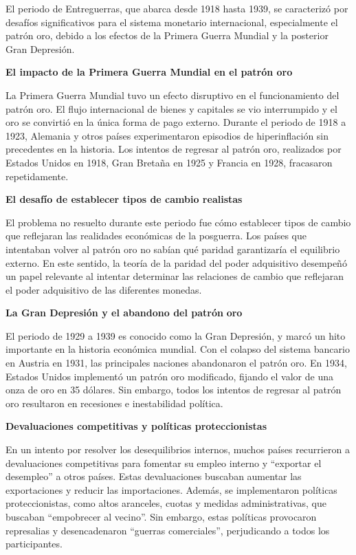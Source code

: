 \documentclass[
  a4paper,
]{article}
\begin{document}
El periodo de Entreguerras, que abarca desde 1918 hasta 1939, se
caracterizó por desafíos significativos para el sistema monetario
internacional, especialmente el patrón oro, debido a los efectos de la
Primera Guerra Mundial y la posterior Gran Depresión.

\textbf{El impacto de la Primera Guerra Mundial en el patrón oro}

La Primera Guerra Mundial tuvo un efecto disruptivo en el funcionamiento
del patrón oro. El flujo internacional de bienes y capitales se vio
interrumpido y el oro se convirtió en la única forma de pago externo.
Durante el periodo de 1918 a 1923, Alemania y otros países
experimentaron episodios de hiperinflación sin precedentes en la
historia. Los intentos de regresar al patrón oro, realizados por Estados
Unidos en 1918, Gran Bretaña en 1925 y Francia en 1928, fracasaron
repetidamente.

\textbf{El desafío de establecer tipos de cambio realistas}

El problema no resuelto durante este periodo fue cómo establecer tipos
de cambio que reflejaran las realidades económicas de la posguerra. Los
países que intentaban volver al patrón oro no sabían qué paridad
garantizaría el equilibrio externo. En este sentido, la teoría de la
paridad del poder adquisitivo desempeñó un papel relevante al intentar
determinar las relaciones de cambio que reflejaran el poder adquisitivo
de las diferentes monedas.

\textbf{La Gran Depresión y el abandono del patrón} \textbf{oro}

El periodo de 1929 a 1939 es conocido como la Gran Depresión, y marcó un
hito importante en la historia económica mundial. Con el colapso del
sistema bancario en Austria en 1931, las principales naciones
abandonaron el patrón oro. En 1934, Estados Unidos implementó un patrón
oro modificado, fijando el valor de una onza de oro en 35 dólares. Sin
embargo, todos los intentos de regresar al patrón oro resultaron en
recesiones e inestabilidad política.

\textbf{Devaluaciones competitivas y políticas proteccionistas}

En un intento por resolver los desequilibrios internos, muchos países
recurrieron a devaluaciones competitivas para fomentar su empleo interno
y ``exportar el desempleo'' a otros países. Estas devaluaciones buscaban
aumentar las exportaciones y reducir las importaciones. Además, se
implementaron políticas proteccionistas, como altos aranceles, cuotas y
medidas administrativas, que buscaban ``empobrecer al vecino''. Sin
embargo, estas políticas provocaron represalias y desencadenaron
``guerras comerciales'', perjudicando a todos los participantes.
\end{document}
